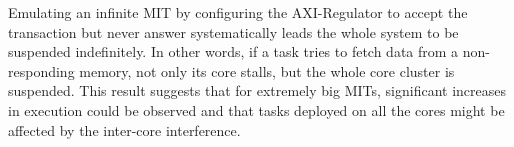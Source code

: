     Emulating an infinite MIT by configuring the AXI-Regulator to accept the transaction but never answer systematically leads the whole system to be suspended indefinitely.
    In other words, if a task tries to fetch data from a non-responding memory, not only its core stalls, but the whole core cluster is suspended.
    This result suggests that for extremely big MITs, significant increases in execution could be observed and that tasks deployed on all the cores might be affected by the inter-core interference.
